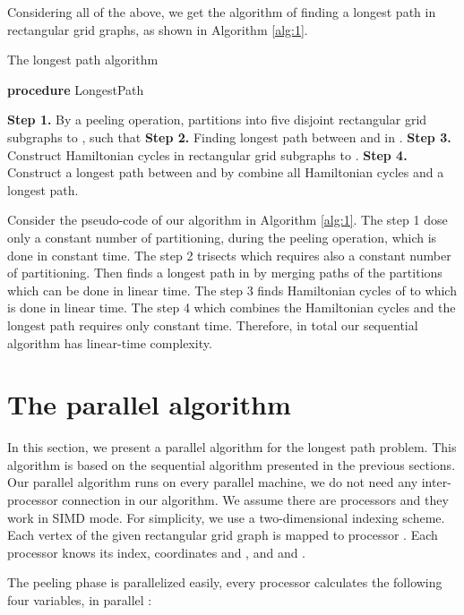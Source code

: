 \documentclass[preprint,12pt]{elsarticle}
\begin{document}
Considering all of the above, we get the algorithm of finding a
longest path in rectangular grid graphs, as shown in Algorithm
\ref{alg:1}.
\newcommand{\LET}{\STATE \textbf{let }}
\newcommand{\SET}{\STATE \textbf{set }}
\newcommand{\PROC}{\STATE \textbf{procedure }}
\newcommand{\RET}{\STATE \textbf{return }}
\begin{algorithm}
\caption{The longest path algorithm} \label{alg:1}
\begin{algorithmic}
\PROC LongestPath
\end{algorithmic}
\begin{algorithmic}
{\small \STATE \textbf{Step 1.} By a peeling operation, 
partitions into five disjoint rectangular grid subgraphs  to
, such that  \STATE \textbf{Step 2.} Finding
longest path between  and  in . \STATE \textbf{Step 3.} Construct Hamiltonian cycles in rectangular
grid subgraphs  to .
 \STATE \textbf{Step 4.} Construct a longest
path between  and  by combine all Hamiltonian cycles and a
longest path.}
\end{algorithmic}
\end{algorithm}

Consider the pseudo-code of our algorithm in Algorithm \ref{alg:1}.
The step 1 dose only a constant number of partitioning, during the
peeling operation, which is done in constant time. The step 2
trisects  which requires also a constant number of
partitioning. Then finds a longest path in  by merging paths of
the partitions which can be done in linear time. The step 3 finds
Hamiltonian cycles of  to  which is done in linear time.
The step 4 which combines the Hamiltonian cycles and the longest
path requires only constant time. Therefore, in total our sequential
algorithm has linear-time complexity.
\section{The parallel algorithm}
In this section, we present a parallel algorithm for the  longest
path problem. This algorithm is based on the sequential algorithm
presented in the previous sections. Our parallel algorithm runs on
every parallel machine, we do not need any inter-processor
connection in our algorithm. We assume there are  processors and
they work in SIMD mode. For simplicity, we use a two-dimensional
indexing scheme. Each vertex  of the given rectangular grid graph
 is mapped to processor . Each processor knows
its index, coordinates  and , and  and . \par The
peeling phase is parallelized easily, every processor calculates the
following four variables, in parallel \cite{CST:AFAFCHPIM}:
\end{document}
